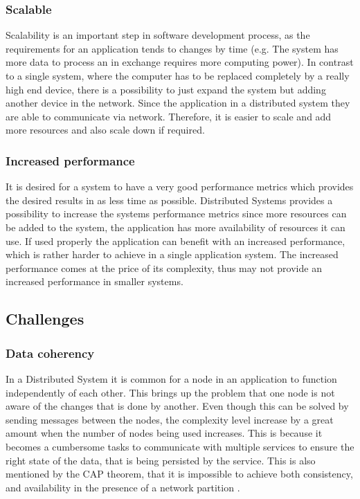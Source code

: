         \subsubsection{Scalable}
        Scalability is an important step in software development process, as the requirements for an application tends to changes by time 
        (e.g. The system has more data to process an in exchange requires more computing power). In contrast to a single system, where the computer 
        has to be replaced completely by a really high end device, there is a possibility to just expand the system but adding another device in the network.
        Since the application in a distributed system they are able to communicate via network. Therefore, it is easier to scale and add more resources and 
        also scale down if required. 

        \subsubsection{Increased performance}
        It is desired for a system to have a very good performance metrics which provides the desired results in as less time as possible.
        Distributed Systems provides a possibility to increase the systems performance metrics since more resources can be added to the system,
        the application has more availability of resources it can use. If used properly the application can benefit with an increased performance, 
        which is rather harder to achieve in a single application system. The increased performance comes at the price of its complexity, thus 
        may not provide an increased performance in smaller systems.
    
    \subsection{Challenges}    

        \subsubsection{Data coherency}
        In a Distributed System it is common for a node in an application to function independently of each other. This brings up the problem that
        one node is not aware of the changes that is done by another. Even though this can be solved by sending messages between the nodes, the complexity
        level increase by a great amount when the number of nodes being used increases. This is because it becomes a cumbersome tasks to communicate with
        multiple services to ensure the right state of the data, that is being persisted by the service. This is also mentioned by the CAP theorem, that it is
        impossible to achieve both consistency, and availability in the presence of a network partition \cite[p.~59]{CAP}.

